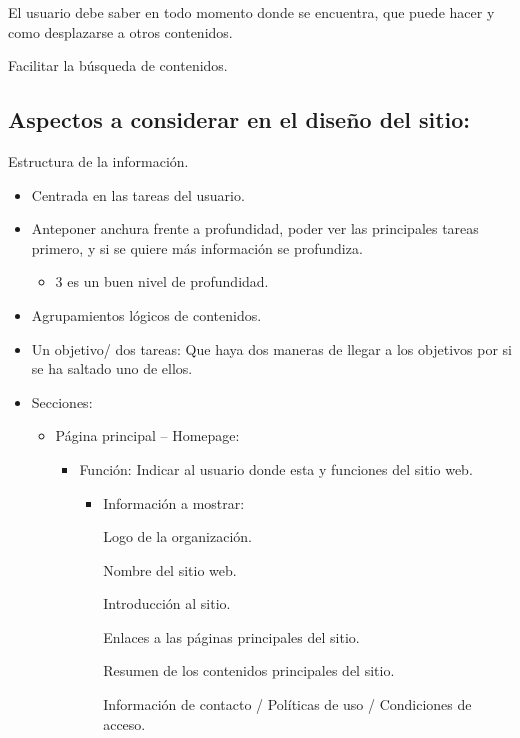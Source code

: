 \documentclass[12pt, twoside, openright]{report} %
\begin{document}
    El usuario debe saber en todo momento donde se encuentra, que
    puede hacer y como desplazarse a otros contenidos.

    Facilitar la búsqueda de contenidos.

    
\subsection{Aspectos a considerar en el diseño del sitio:}

Estructura de la información.

\begin{itemize}
  \item
    Centrada en las tareas del usuario.
  \item
    Anteponer anchura frente a profundidad, poder ver las
    principales tareas primero, y si se quiere más información se
    profundiza.
    \begin{itemize}
      \item
        3 es un buen nivel de profundidad.
    \end{itemize}
  \item
    Agrupamientos lógicos de contenidos.
  \item
    Un objetivo/ dos tareas: Que haya dos maneras de llegar a los
    objetivos por si se ha saltado uno de ellos.
    \pagebreak

  \item Secciones:
    \begin{itemize}
      \item Página principal -- Homepage:
        \begin{itemize}
          \item Función: Indicar al usuario donde esta y funciones del sitio
            web.
            \begin{itemize}
              \item
                Información a mostrar:

                Logo de la organización.

                Nombre del sitio web.

                Introducción al sitio.

                Enlaces a las páginas principales del sitio.

                Resumen de los contenidos principales del sitio.

                Información de contacto / Políticas de uso / Condiciones
                de acceso.


\end{itemize}
\end{itemize}
\end{itemize}
\end{itemize}
\end{document}
